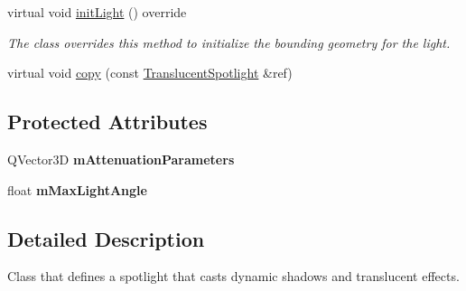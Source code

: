 \begin{DoxyCompactItemize}
\mbox{\label{class_geometry_engine_1_1_geometry_world_item_1_1_geometry_light_1_1_translucent_spotlight_a367f084ec083676db26a2805628a6f35}} 
virtual void \mbox{\hyperlink{class_geometry_engine_1_1_geometry_world_item_1_1_geometry_light_1_1_translucent_spotlight_a367f084ec083676db26a2805628a6f35}{init\+Light}} () override
\begin{DoxyCompactList}\small\item\em The class overrides this method to initialize the bounding geometry for the light. \end{DoxyCompactList}\item 
virtual void \mbox{\hyperlink{class_geometry_engine_1_1_geometry_world_item_1_1_geometry_light_1_1_translucent_spotlight_a6686c96daf784ea71e885b7e5195bc4d}{copy}} (const \mbox{\hyperlink{class_geometry_engine_1_1_geometry_world_item_1_1_geometry_light_1_1_translucent_spotlight}{Translucent\+Spotlight}} \&ref)
\end{DoxyCompactItemize}
\subsection*{Protected Attributes}
\begin{DoxyCompactItemize}
\item 
\mbox{\label{class_geometry_engine_1_1_geometry_world_item_1_1_geometry_light_1_1_translucent_spotlight_a39faadcbb6631adf60e08e019782c534}} 
Q\+Vector3D {\bfseries m\+Attenuation\+Parameters}
\item 
\mbox{\label{class_geometry_engine_1_1_geometry_world_item_1_1_geometry_light_1_1_translucent_spotlight_a42f9eba980617701ce0ebfa588bddb2e}} 
float {\bfseries m\+Max\+Light\+Angle}
\end{DoxyCompactItemize}


\subsection{Detailed Description}
Class that defines a spotlight that casts dynamic shadows and translucent effects. 

